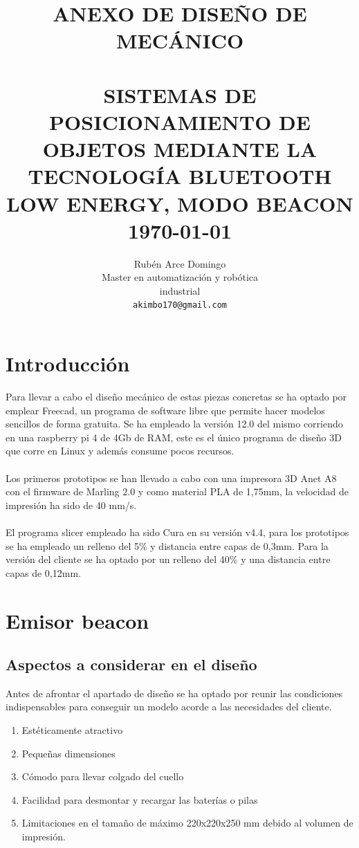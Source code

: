 \documentclass[paper=a4, fontsize=11pt,twoside]{scrartcl}
\title{	\normalsize \textsc{ANEXO DE DISEÑO DE MECÁNICO} 	%
		 	\\[2.0cm]								%
			\HRule{0.5pt} \\						%
			\LARGE \textbf{\uppercase{Sistemas de posicionamiento de objetos mediante la tecnología Bluetooth Low Energy, modo Beacon}}	%
			\HRule{2pt} \\ [0.5cm]		%
			\normalsize \today			%
		}
\author{
		Rubén Arce Domingo\\	
		Master en automatización y robótica\\	
		industrial\\
        \texttt{akimbo170@gmail.com} \\
}
\makeatletter
\def\printtitle{%
    {\centering \@title\par}}
\def\printauthor{%
    {\centering \large \@author}}
\makeatother
\begin{document}
\thispagestyle{empty}		%
\printtitle					%
  	\vfill
\printauthor				%
\newpage
\cleardoublepage
\tableofcontents
\listoffigures
\cleardoublepage
\section{Introducción}
    Para llevar a cabo el diseño mecánico de estas piezas concretas se ha optado por emplear Freecad, un
    programa de software libre que permite hacer modelos sencillos de forma gratuita.
    Se ha empleado la versión 12.0 del mismo corriendo en una raspberry pi 4 de 4Gb de RAM, este es el único
    programa de diseño 3D que corre en Linux  y además consume pocos recursos.
    \paragraph{}
    Los primeros prototipos se han llevado a cabo con una impresora 3D Anet A8 con el firmware de Marling
    2.0 y como material PLA de 1,75mm, la velocidad de impresión ha sido de 40 mm/s.
    \paragraph{}
    El programa slicer empleado ha sido Cura en su versión v4.4, para los prototipos se ha empleado un relleno del 5\% y distancia
    entre capas de 0,3mm. Para la versión del cliente se ha optado por un relleno del 40\% y una distancia entre capas de 0,12mm.
\section{Emisor beacon}
    \subsection{Aspectos a considerar en el diseño}
        Antes de afrontar el apartado de diseño se ha optado por reunir las condiciones indispensables para 
        conseguir un modelo acorde a las necesidades del cliente.
        \begin{enumerate}
            \item Estéticamente atractivo
            \item Pequeñas dimensiones
            \item Cómodo para llevar colgado del cuello
            \item Facilidad para desmontar y recargar las baterías o pilas
            \item Limitaciones en el tamaño de máximo 220x220x250 mm debido al volumen de impresión.
        \end{enumerate}
\end{document}
